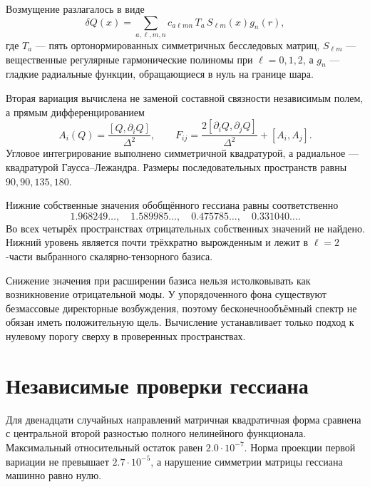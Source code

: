 Возмущение разлагалось в виде
\begin{equation}
 \delta Q(x)=\sum_{a,\ell,m,n}
 c_{a\ell mn}\,T_a\,S_{\ell m}(x)g_n(r),
 \label{eq:v6-five-component-galerkin-basis}
\end{equation}
где $T_a$ --- пять ортонормированных симметричных бесследовых матриц,
$S_{\ell m}$ --- вещественные регулярные гармонические полиномы при
$\ell=0,1,2$, а $g_n$ --- гладкие радиальные функции, обращающиеся в нуль
на границе шара.

Вторая вариация вычислена не заменой составной связности независимым полем,
а прямым дифференцированием
\begin{equation}
 A_i(Q)=\frac{[Q,\partial_iQ]}{\Delta^2},
 \qquad
 F_{ij}=\frac{2[\partial_iQ,\partial_jQ]}{\Delta^2}+[A_i,A_j].
 \label{eq:v6-composite-full-hessian-identities}
\end{equation}
Угловое интегрирование выполнено симметричной квадратурой, а радиальное ---
квадратурой Гаусса--Лежандра. Размеры последовательных пространств равны
$90,90,135,180$.

Нижние собственные значения обобщённого гессиана равны соответственно
\begin{equation}
 1.968249\ldots,
 \quad1.589985\ldots,
 \quad0.475785\ldots,
 \quad0.331040\ldots.
 \label{eq:v6-nonradial-lowest-sequence}
\end{equation}
Во всех четырёх пространствах отрицательных собственных значений не
найдено. Нижний уровень является почти трёхкратно вырожденным и лежит в
$\ell=2$-части выбранного скалярно-тензорного базиса.

Снижение значения при расширении базиса нельзя истолковывать как
возникновение отрицательной моды. У упорядоченного фона существуют
безмассовые директорные возбуждения, поэтому бесконечнообъёмный спектр не
обязан иметь положительную щель. Вычисление устанавливает только подход к
нулевому порогу сверху в проверенных пространствах.

\section{Независимые проверки гессиана}

Для двенадцати случайных направлений матричная квадратичная форма сравнена
с центральной второй разностью полного нелинейного функционала. Максимальный
относительный остаток равен $2.0\cdot10^{-7}$. Норма проекции первой
вариации не превышает $2.7\cdot10^{-5}$, а нарушение симметрии матрицы
гессиана машинно равно нулю.

